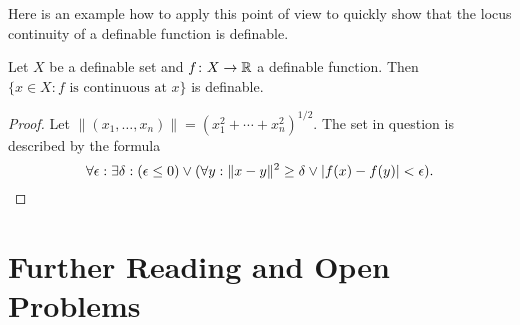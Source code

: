 Here is an example how to apply this point of view to quickly show
that the locus continuity of a definable function is definable.

\begin{lemma}
  Let $X$ be a definable set and $f\colon X\rightarrow{\mathbb{R}}$ a definable
  function. Then $\{ x \in X : f \text{ is continuous at }x\}$ is
  definable. 
\end{lemma}
\begin{proof}
  Let $\|(x_1,\ldots,x_n)\| = (x_1^2+\cdots+x_n^2)^{1/2}$.
  The set in question is described by the formula
  \begin{equation*}
 \forall \epsilon : \exists \delta : (\epsilon \le 0)
    \vee
    (\forall y : \|x-y\|^2\ge \delta \vee |f(x)-f(y)|<\epsilon).\qedhere
  \end{equation*}
\end{proof}

\section{Further Reading and Open Problems}


